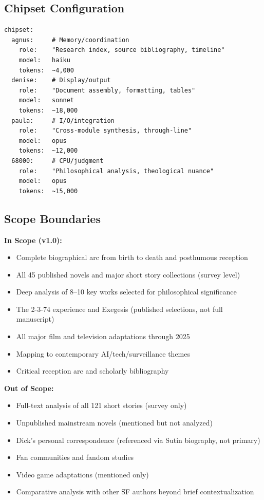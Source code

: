 \documentclass[11pt,letterpaper]{article}
\begin{document}
\subsection{Chipset Configuration}

\begin{asciibox}
\begin{verbatim}
chipset:
  agnus:     # Memory/coordination
    role:    "Research index, source bibliography, timeline"
    model:   haiku
    tokens:  ~4,000
  denise:    # Display/output
    role:    "Document assembly, formatting, tables"
    model:   sonnet
    tokens:  ~18,000
  paula:     # I/O/integration
    role:    "Cross-module synthesis, through-line"
    model:   opus
    tokens:  ~12,000
  68000:     # CPU/judgment
    role:    "Philosophical analysis, theological nuance"
    model:   opus
    tokens:  ~15,000
\end{verbatim}
\end{asciibox}

\subsection{Scope Boundaries}

\textbf{In Scope (v1.0):}
\begin{itemize}[leftmargin=2em]
\item Complete biographical arc from birth to death and posthumous reception
\item All 45 published novels and major short story collections (survey level)
\item Deep analysis of 8--10 key works selected for philosophical significance
\item The 2-3-74 experience and Exegesis (published selections, not full manuscript)
\item All major film and television adaptations through 2025
\item Mapping to contemporary AI/tech/surveillance themes
\item Critical reception arc and scholarly bibliography
\end{itemize}

\textbf{Out of Scope:}
\begin{itemize}[leftmargin=2em]
\item Full-text analysis of all 121 short stories (survey only)
\item Unpublished mainstream novels (mentioned but not analyzed)
\item Dick's personal correspondence (referenced via Sutin biography, not primary)
\item Fan communities and fandom studies
\item Video game adaptations (mentioned only)
\item Comparative analysis with other SF authors beyond brief contextualization
\end{itemize}
\end{document}

